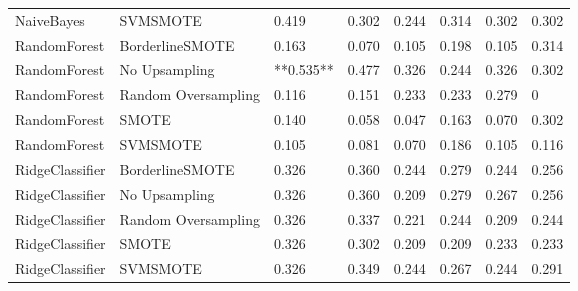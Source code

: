 \begin{tabular}{llllllll}
                  NaiveBayes &            SVMSMOTE &     0.419 &                     0.302 &                 0.244 &                  0.314 &                                   0.302 &     0.302 \\
                RandomForest &     BorderlineSMOTE &     0.163 &                     0.070 &                 0.105 &                  0.198 &                                   0.105 &     0.314 \\
                RandomForest &       No Upsampling & **0.535** &                     0.477 &                 0.326 &                  0.244 &                                   0.326 &     0.302 \\
                RandomForest & Random Oversampling &     0.116 &                     0.151 &                 0.233 &                  0.233 &                                   0.279 &         0 \\
                RandomForest &               SMOTE &     0.140 &                     0.058 &                 0.047 &                  0.163 &                                   0.070 &     0.302 \\
                RandomForest &            SVMSMOTE &     0.105 &                     0.081 &                 0.070 &                  0.186 &                                   0.105 &     0.116 \\
             RidgeClassifier &     BorderlineSMOTE &     0.326 &                     0.360 &                 0.244 &                  0.279 &                                   0.244 &     0.256 \\
             RidgeClassifier &       No Upsampling &     0.326 &                     0.360 &                 0.209 &                  0.279 &                                   0.267 &     0.256 \\
             RidgeClassifier & Random Oversampling &     0.326 &                     0.337 &                 0.221 &                  0.244 &                                   0.209 &     0.244 \\
             RidgeClassifier &               SMOTE &     0.326 &                     0.302 &                 0.209 &                  0.209 &                                   0.233 &     0.233 \\
             RidgeClassifier &            SVMSMOTE &     0.326 &                     0.349 &                 0.244 &                  0.267 &                                   0.244 &     0.291 \\

\end{tabular}
